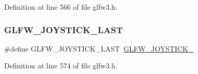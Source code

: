 Definition at line 566 of file glfw3.\+h.

\mbox{\label{group__joysticks_ga9ca13ebf24c331dd98df17d84a4b72c9}} 
\subsubsection{\texorpdfstring{GLFW\_JOYSTICK\_LAST}{GLFW\_JOYSTICK\_LAST}}
{\footnotesize\ttfamily \#define G\+L\+F\+W\+\_\+\+J\+O\+Y\+S\+T\+I\+C\+K\+\_\+\+L\+A\+ST~\mbox{\hyperlink{group__joysticks_ga453edeeabf350827646b6857df4f80ce}{G\+L\+F\+W\+\_\+\+J\+O\+Y\+S\+T\+I\+C\+K\+\_}}}



Definition at line 574 of file glfw3.\+h.

